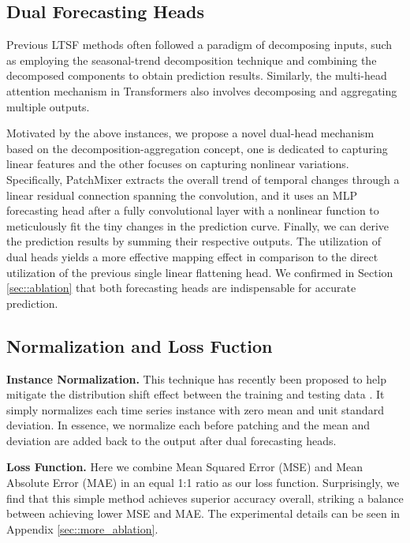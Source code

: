 \documentclass{article} \usepackage{iclr2024_conference,times}
\begin{document}
\subsection{Dual Forecasting Heads}
Previous LTSF methods often followed a paradigm of decomposing inputs, such as employing the seasonal-trend decomposition technique and combining the decomposed components to obtain prediction results. Similarly, the multi-head attention mechanism in Transformers also involves decomposing and aggregating multiple outputs. 

Motivated by the above instances, we propose a novel dual-head mechanism based on the decomposition-aggregation concept, one is dedicated to capturing linear features and the other focuses on capturing nonlinear variations. Specifically, PatchMixer extracts the overall trend of temporal changes through a linear residual connection spanning the convolution, and it uses an MLP forecasting head after a fully convolutional layer with a nonlinear function to meticulously fit the tiny changes in the prediction curve. Finally, we can derive the prediction results by summing their respective outputs. The utilization of dual heads yields a more effective mapping effect in comparison to the direct utilization of the previous single linear flattening head. We confirmed in Section \ref{sec::ablation} that both forecasting heads are indispensable for accurate prediction.

\subsection{Normalization and Loss Fuction}

\textbf{Instance Normalization.} This technique has recently been proposed to help mitigate the distribution shift effect between the training and testing data \citep{instance,revin}. It simply normalizes each time series instance  with zero mean and unit standard deviation. In essence, we normalize each  before patching and the mean and deviation are added back to the output after dual forecasting heads.   



\textbf{Loss Function.} Here we combine Mean Squared Error (MSE) and Mean Absolute Error (MAE) in an equal 1:1 ratio as our loss function. Surprisingly, we find that this simple method achieves superior accuracy overall, striking a balance between achieving lower MSE and MAE. The experimental details can be seen in Appendix \ref{sec::more_ablation}. 
\end{document}
